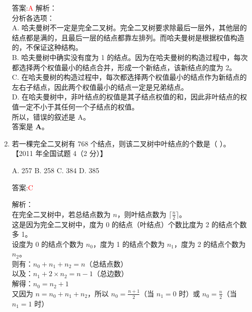 \documentclass[lang=cn,newtx,10pt,scheme=chinese]{../../../elegantbook}
\begin{document}
\begin{enumerate}
        答案:\textcolor{red}{A}
        解析：\\
        分析各选项：\\
        
        A. 哈夫曼树不一定是完全二叉树。完全二叉树要求除最后一层外，其他层的结点都是满的，且最后一层的结点都靠左排列。而哈夫曼树是根据权值构造的，不保证这种结构。\\
        
        B. 哈夫曼树中确实没有度为 1 的结点。因为在哈夫曼树的构造过程中，每次都选择两个权值最小的结点合并，形成一个新结点，该新结点的度为 2。\\
        
        C. 在哈夫曼树的构造过程中，每次都选择两个权值最小的结点作为新结点的左右子结点，因此两个权值最小的结点一定是兄弟结点。\\
        
        D. 在哈夫曼树中，非叶结点的权值是其子结点权值的和，因此非叶结点的权值一定不小于其任何一个子结点的权值。\\
        
        所以，错误的叙述是 A。\\
        答案是 \textbf{A}。  

        \item 若一棵完全二叉树有 768 个结点，则该二叉树中叶结点的个数是（ ）。  
        【2011 年全国试题 4（2 分）】  
    
        A. 257 \quad B. 258 \quad C. 384 \quad D. 385  
    
        答案:\textcolor{red}{C}
        
        解析：\\
        在完全二叉树中，若总结点数为 $n$，则叶结点数为 $\lceil \frac{n}{2} \rceil$。\\
        
        这是因为完全二叉树中，度为 0 的结点（叶结点）个数比度为 2 的结点个数多 1。\\
        设度为 0 的结点个数为 $n_0$，度为 1 的结点个数为 $n_1$，度为 2 的结点个数为 $n_2$。\\
        则有：$n_0 + n_1 + n_2 = n$（总结点数）\\
        以及：$n_1 + 2 \times n_2 = n - 1$（总边数）\\
        
        解得：$n_0 = n_2 + 1$\\
        
        又因为 $n = n_0 + n_1 + n_2$，所以 $n_0 = \frac{n+1}{2}$（当 $n_1 = 0$ 时）或 $n_0 = \frac{n}{2}$（当 $n_1 = 1$ 时）\\
        

\end{enumerate}
\end{document}

